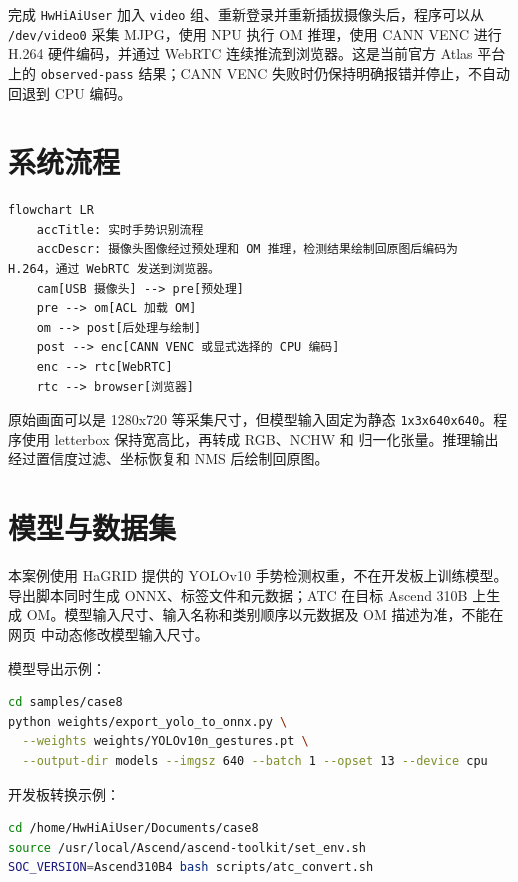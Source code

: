 完成 \passthrough{\lstinline!HwHiAiUser!} 加入
\passthrough{\lstinline!video!}
组、重新登录并重新插拔摄像头后，程序可以从
\passthrough{\lstinline!/dev/video0!} 采集 MJPG，使用 NPU 执行 OM
推理，使用 CANN VENC 进行 H.264 硬件编码，并通过 WebRTC
连续推流到浏览器。这是当前官方 Atlas 平台上的
\passthrough{\lstinline!observed-pass!} 结果；CANN VENC
失败时仍保持明确报错并停止，不自动回退到 CPU 编码。

\section{系统流程}\label{ux7cfbux7edfux6d41ux7a0b}

\begin{lstlisting}
flowchart LR
    accTitle: 实时手势识别流程
    accDescr: 摄像头图像经过预处理和 OM 推理，检测结果绘制回原图后编码为 H.264，通过 WebRTC 发送到浏览器。
    cam[USB 摄像头] --> pre[预处理]
    pre --> om[ACL 加载 OM]
    om --> post[后处理与绘制]
    post --> enc[CANN VENC 或显式选择的 CPU 编码]
    enc --> rtc[WebRTC]
    rtc --> browser[浏览器]
\end{lstlisting}

原始画面可以是 1280x720 等采集尺寸，但模型输入固定为静态
\passthrough{\lstinline!1x3x640x640!}。程序使用 letterbox
保持宽高比，再转成 RGB、NCHW 和
归一化张量。推理输出经过置信度过滤、坐标恢复和 NMS 后绘制回原图。

\section{模型与数据集}\label{ux6a21ux578bux4e0eux6570ux636eux96c6}

本案例使用 HaGRID 提供的 YOLOv10 手势检测权重，不在开发板上训练模型。
导出脚本同时生成 ONNX、标签文件和元数据；ATC 在目标 Ascend 310B 上生成
OM。模型输入尺寸、输入名称和类别顺序以元数据及 OM 描述为准，不能在网页
中动态修改模型输入尺寸。

模型导出示例：

\begin{lstlisting}[language=bash]
cd samples/case8
python weights/export_yolo_to_onnx.py \
  --weights weights/YOLOv10n_gestures.pt \
  --output-dir models --imgsz 640 --batch 1 --opset 13 --device cpu
\end{lstlisting}

开发板转换示例：

\begin{lstlisting}[language=bash]
cd /home/HwHiAiUser/Documents/case8
source /usr/local/Ascend/ascend-toolkit/set_env.sh
SOC_VERSION=Ascend310B4 bash scripts/atc_convert.sh
\end{lstlisting}

